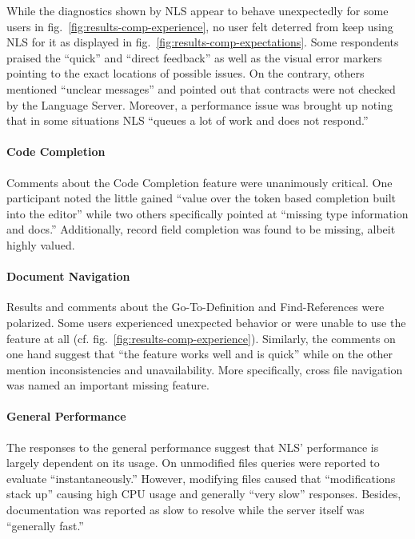\documentclass[
  a4paper,
  bibtex,
  english,
  nomenclature]{kthlatex/kththesis/kththesis}
\begin{document}
While the diagnostics shown by NLS appear to behave unexpectedly for
some users in fig.~\ref{fig:results-comp-experience}, no user felt
deterred from keep using NLS for it as displayed in
fig.~\ref{fig:results-comp-expectations}. Some respondents praised the
``quick'' and ``direct feedback'' as well as the visual error markers
pointing to the exact locations of possible issues. On the contrary,
others mentioned ``unclear messages'' and pointed out that contracts
were not checked by the Language Server. Moreover, a performance issue
was brought up noting that in some situations NLS ``queues a lot of work
and does not respond.''

\hypertarget{sec:code-completion-res}{%
\paragraph{Code Completion}\label{sec:code-completion-res}}

Comments about the Code Completion feature were unanimously critical.
One participant noted the little gained ``value over the token based
completion built into the editor'' while two others specifically pointed
at ``missing type information and docs.'' Additionally, record field
completion was found to be missing, albeit highly valued.

\hypertarget{sec:document-navigation-res}{%
\paragraph{Document Navigation}\label{sec:document-navigation-res}}

Results and comments about the Go-To-Definition and Find-References were
polarized. Some users experienced unexpected behavior or were unable to
use the feature at all (cf. fig.~\ref{fig:results-comp-experience}).
Similarly, the comments on one hand suggest that ``the feature works
well and is quick'' while on the other mention inconsistencies and
unavailability. More specifically, cross file navigation was named an
important missing feature.

\hypertarget{sec:general-performance-res}{%
\paragraph{General Performance}\label{sec:general-performance-res}}

The responses to the general performance suggest that NLS' performance
is largely dependent on its usage. On unmodified files queries were
reported to evaluate ``instantaneously.'' However, modifying files
caused that ``modifications stack up'' causing high CPU usage and
generally ``very slow'' responses. Besides, documentation was reported
as slow to resolve while the server itself was ``generally fast.''
\end{document}
